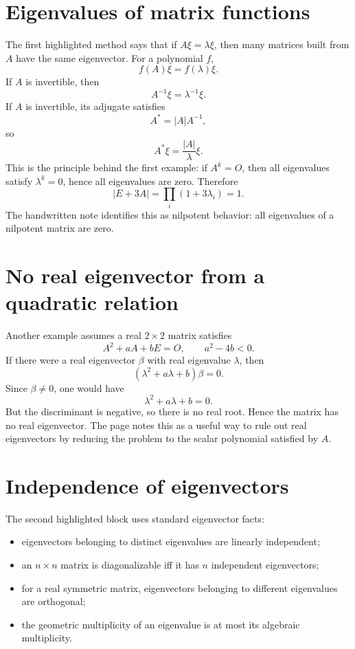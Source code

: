 


\section{Eigenvalues of matrix functions}

The first highlighted method says that if $A\xi=\lambda\xi$, then many matrices built from $A$ have the same eigenvector.  For a polynomial $f$,
\[
  f(A)\xi=f(\lambda)\xi.
\]
If $A$ is invertible, then
\[
  A^{-1}\xi=\lambda^{-1}\xi.
\]
If $A$ is invertible, its adjugate satisfies
\[
  A^*=|A|A^{-1},
\]
so
\[
  A^*\xi=
\frac{|A|}{\lambda}\xi.
\]
This is the principle behind the first example: if $A^k=O$, then all eigenvalues satisfy $\lambda^k=0$, hence all eigenvalues are zero.  Therefore
\[
  |E+3A|=\prod_i(1+3\lambda_i)=1.
\]
The handwritten note identifies this as nilpotent behavior: all eigenvalues of a nilpotent matrix are zero.

\section{No real eigenvector from a quadratic relation}

Another example assumes a real $2\times2$ matrix satisfies
\[
  A^2+aA+bE=O,\qquad a^2-4b<0.
\]
If there were a real eigenvector $\beta$ with real eigenvalue $\lambda$, then
\[
  (\lambda^2+a\lambda+b)\beta=0.
\]
Since $\beta\ne0$, one would have
\[
  \lambda^2+a\lambda+b=0.
\]
But the discriminant is negative, so there is no real root.  Hence the matrix has no real eigenvector.  The page notes this as a useful way to rule out real eigenvectors by reducing the problem to the scalar polynomial satisfied by $A$.

\section{Independence of eigenvectors}

The second highlighted block uses standard eigenvector facts:
\begin{itemize}
  \item eigenvectors belonging to distinct eigenvalues are linearly independent;
  \item an $n\times n$ matrix is diagonalizable iff it has $n$ independent eigenvectors;
  \item for a real symmetric matrix, eigenvectors belonging to different eigenvalues are orthogonal;
  \item the geometric multiplicity of an eigenvalue is at most its algebraic multiplicity.
\end{itemize}

